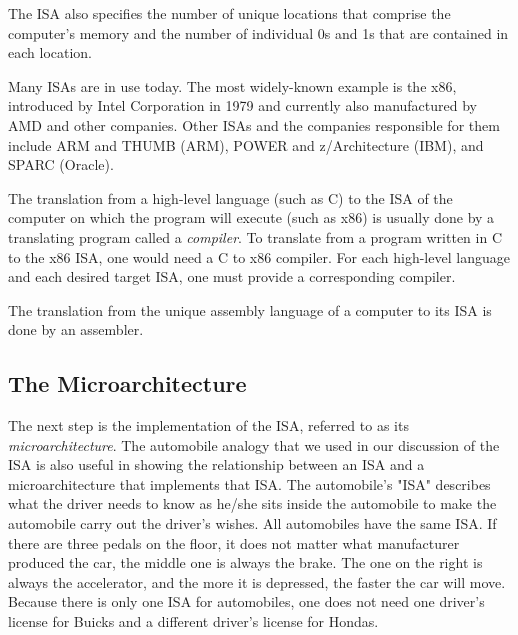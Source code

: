 \documentclass{patt}
\begin{document}
The ISA also specifies the number of unique locations that comprise the
computer's memory and the number of individual 0s and 1s that are
contained in each location.

Many ISAs are in use today.  The most widely-known example is the x86, 
introduced by Intel Corporation in 1979 and currently also manufactured 
by AMD and other companies.  Other ISAs and the companies responsible for 
them include ARM and THUMB (ARM), POWER and z/Architecture (IBM), 
and SPARC (Oracle).

The translation from a high-level language (such as C) to the ISA of the
computer on which the program will execute (such as x86) is usually done by a
translating program called a {\em compiler}.  To translate from a program 
written in C to the x86 ISA, one would need 
a C to x86 compiler.  For each high-level language and each desired
target ISA, one must provide a corresponding compiler.

The translation from the unique assembly language of a computer
to its ISA is done by an assembler.

\enlargethispage{-\baselineskip}

\subsection{The Microarchitecture}

The next step is the implementation of the ISA, referred to as 
its {\em microarchitecture}.  The automobile analogy that we used in our 
discussion of the ISA is also useful in showing the relationship between 
an ISA and a microarchitecture that implements that ISA.  The automobile's 
"ISA" describes what the driver needs to know as he/she sits inside the 
automobile to make the automobile carry out the driver's wishes.  All 
automobiles have the same ISA.  If there are three pedals on the floor, 
it does not matter what manufacturer produced the car, the middle one is 
always the brake.  The one on the right is always the accelerator, and the 
more it is depressed, the faster the car will move.  Because there is only 
one ISA for automobiles, one does not need one driver's license for Buicks 
and a different driver's license for Hondas. 
\end{document}
